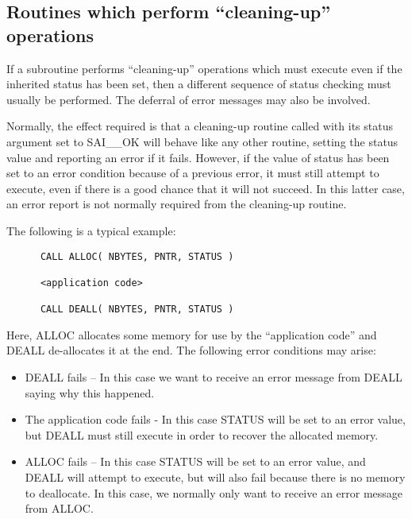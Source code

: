 \subsection {Routines which perform ``cleaning-up'' operations}

If a subroutine performs ``cleaning-up'' operations which must execute even
if the inherited status has been set, then a different sequence of status 
checking must usually be performed.
The deferral of error messages may also be involved.

Normally, the effect required is that a cleaning-up routine called with 
its status argument set to SAI\_\_OK will behave like any other routine, 
setting the status value and reporting an error if it fails.
However, if the value of status has been set to an error condition because of 
a previous error, it must still attempt to execute, even if there is a
good chance that it will not succeed.
In this latter case, an error report is not normally required from the
cleaning-up routine. 

The following is a typical example:

\begin {small}
\begin{verbatim}
      CALL ALLOC( NBYTES, PNTR, STATUS )

      <application code>

      CALL DEALL( NBYTES, PNTR, STATUS )
\end{verbatim}
\end {small}

Here, ALLOC allocates some memory for use by the ``application code'' and 
DEALL de-allocates it at the end.
The following error conditions may arise:

\begin{itemize}
\item DEALL fails -- In this case we want to receive an error message from
DEALL saying why this happened. 

\item The application code fails - In this case STATUS will be set to an
error value, but DEALL must still execute in order to recover the allocated
memory. 

\item ALLOC fails -- In this case STATUS will be set to an error value, and
DEALL will attempt to execute, but will also fail because there is no memory
to deallocate. 
In this case, we normally only want to receive an error message from ALLOC.
\end {itemize}

